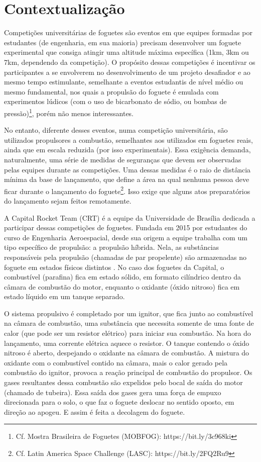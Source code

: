 \chapter[Contextualização]{Contextualização}

Competições universitárias de foguetes são eventos em que equipes formadas por estudantes (de engenharia, em sua maioria) precisam desenvolver um foguete experimental que consiga atingir uma altitude máxima específica (1km, 3km ou 7km, dependendo da competição). O propósito dessas competições é incentivar os participantes a se envolverem no desenvolvimento de um projeto desafiador e ao mesmo tempo estimulante, semelhante a eventos estudantis de nível médio ou mesmo fundamental, nos quais a propulsão do foguete é emulada com experimentos lúdicos (com o uso de bicarbonato de sódio, ou bombas de pressão)\footnote{Cf. Mostra Brasileira de Foguetes (MOBFOG): https://bit.ly/3c968ki}, porém não menos interessantes.
\par No entanto, diferente desses eventos, numa competição universitária, são utilizados propulsores a combustão, semelhantes aos utilizados em foguetes reais, ainda que em escala reduzida (por isso experimentais). Essa exigência demanda, naturalmente, uma série de medidas de seguranças que devem ser observadas pelas equipes durante as competições. Uma dessas medidas é o raio de distância mínima da base de lançamento, que define a área na qual nenhuma pessoa deve ficar durante o lançamento do foguete\footnote{Cf. Latin America Space Challenge (LASC): https://bit.ly/2FQ2Ru9}. Isso exige que alguns atos preparatórios do lançamento sejam feitos remotamente.
\par A Capital Rocket Team (CRT) é a equipe da Universidade de Brasília dedicada a participar dessas competições de foguetes. Fundada em 2015 por estudantes do curso de Engenharia Aeroespacial, desde sua origem a equipe trabalha com um tipo específico de propulsão: a propulsão híbrida. Nela, as substâncias responsáveis pela propulsão (chamadas de par propelente) são armazenadas no foguete em estados físicos distintos \cite{sutton}. No caso dos foguetes da Capital, o combustível (parafina) fica em estado sólido, em formato cilíndrico dentro da câmara de combustão do motor, enquanto o oxidante (óxido nitroso) fica em estado líquido em um tanque separado.
\par O sistema propulsivo é completado por um ignitor, que fica junto ao combustível na câmara de combustão, uma substância que necessita somente de uma fonte de calor (que pode ser um resistor elétrico) para iniciar sua combustão. Na hora do lançamento, uma corrente elétrica aquece o resistor. O tanque contendo o óxido nitroso é aberto, despejando o oxidante na câmara de combustão. A mistura do oxidante com o combustível contido na câmara, mais o calor gerado pela combustão do ignitor, provoca a reação principal de combustão do propulsor. Os gases resultantes dessa combustão são expelidos pelo bocal de saída do motor (chamado de tubeira). Essa saída dos gases gera uma força de empuxo direcionada para o solo, o que faz o foguete deslocar no sentido oposto, em direção ao apogeu. E assim é feita a decolagem do foguete.

